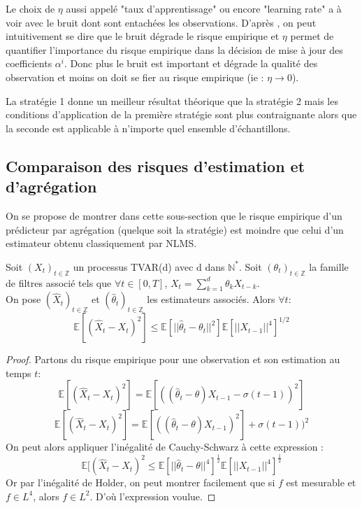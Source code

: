 \documentclass{report}
\begin{document}
\begin{Rque}
Le choix de $\eta$ aussi appelé "taux d'apprentissage" ou encore "learning rate" a à voir avec le bruit dont sont entachées les observations. D'après  \citep{giraud-roueff-sanchez-aos2015}, on peut intuitivement se dire que le bruit dégrade le risque empirique et $\eta$ permet de quantifier l'importance du risque empirique dans la décision de mise à jour des coefficients $\alpha^{i}$. Donc plus le bruit est important et dégrade la qualité des observation et moins on doit se fier au risque empirique (ie : $\eta {\rightarrow} 0$).
\end{Rque}

\begin{Rque}
La stratégie 1 donne un meilleur résultat théorique que la stratégie 2 mais les conditions d'application de la première stratégie sont plus contraignante alors que la seconde est applicable à n'importe quel ensemble d'échantillons.
\end{Rque}

\subsection{Comparaison des risques d'estimation et d'agrégation}
On se propose de montrer dans cette sous-section que le risque empirique d'un prédicteur par agrégation (quelque soit la stratégie) est moindre que celui d'un estimateur obtenu classiquement par NLMS.
\begin{Prop}
Soit $(X_t)_{t \in \mathbb{Z}}$ un processus TVAR(d) avec d dans $\mathbb{N}^*$. Soit $(\theta_t)_{t \in \mathbb{Z}}$ la famille de filtres associé tels que $\forall t \in [0,T]$, $X_t = \sum_{k=1}^d \theta_k X_{t-k}$.\\
On pose $(\hat X_t)_{t \in \mathbb{Z}}$ et $(\hat\theta_t)_{t \in \mathbb{Z}}$ les estimateurs associés. Alors $\forall t$: \\
\begin{equation}
\mathbb{E}[(\hat X_t - X_t)^2] \leq \mathbb{E}[||\hat \theta_t - \theta_t||^2] \mathbb{E}[||X_{t-1}||^4]^{1/2}
\end{equation}
\end{Prop}
\begin{proof}
Partons du risque empirique pour une observation et son estimation au temps $t$:
\begin{equation}
\mathbb{E}[(\hat X_t - X_t)^2] = \mathbb{E}[((\hat\theta_t - \theta) X_{t-1} - \sigma(t-1))^2]
\end{equation}
\begin{equation}
\mathbb{E}[(\hat X_t - X_t)^2] = \mathbb{E}[((\hat\theta_t - \theta) X_{t-1})^2] + \sigma(t-1))^2
\end{equation}
On peut alors appliquer l'inégalité de Cauchy-Schwarz à cette expression :
\begin{equation}
\mathbb{E}[(\hat X_t - X_t)^2 \leq \mathbb{E}[||\hat\theta_t - \theta||^4]^{\frac{1}{2}} \mathbb{E}[||X_{t-1}||^4]^{\frac{1}{2}}
\end{equation}
Or par l'inégalité de Holder, on peut montrer facilement que si $f$ est mesurable et $f \in L^4$, alors $f \in L^2$. D'où l'expression voulue.
\end{proof}
\end{document}
